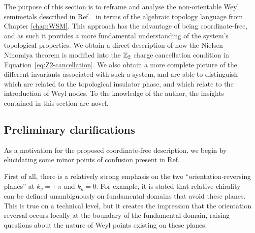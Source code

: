 \label{sec:non-ori_topology}

The purpose of this section is to reframe and analyse the non-orientable Weyl semimetals described in Ref.~\cite{Fonseca-Vaidya_nonorientable} in terms of the algebraic topology language from Chapter \ref{chap:WSM}. This approach has the advantage of being coordinate-free, and as such it provides a more fundamental understanding of the system's topological properties. We obtain a direct description of how the Nielsen--Ninomiya theorem is modified into the $\mathbb{Z}_2$ charge cancellation condition in Equation~\eqref{eq:Z2-cancellation}. We also obtain a more complete picture of the different invariants associated with such a system, and are able to distinguish which are related to the topological insulator phase, and which relate to the introduction of Weyl nodes. To the knowledge of the author, the insights contained in this section are novel.

\subsection{Preliminary clarifications}\label{sec:clarifications}

As a motivation for the proposed coordinate-free description, we begin by elucidating some minor points of confusion present in Ref.~\cite{Fonseca-Vaidya_nonorientable}.

First of all, there is a relatively strong emphasis on the two ``orientation-reversing planes'' at $k_y=\pm\pi$ and $k_y=0$. For example, it is stated that relative chirality can be defined unambiguously on fundamental domains that avoid these planes. This is true on a technical level, but it creates the impression that the orientation reversal occurs locally at the boundary of the fundamental domain, raising questions about the nature of Weyl points existing on these planes.

